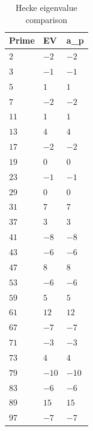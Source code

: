 \begin{table}[ht]
\centering
\begin{tabular}{lll}
\toprule
Prime & EV & a_p \\
\midrule
$2$ & $-2$ & $-2$ \\
$3$ & $-1$ & $-1$ \\
$5$ & $1$ & $1$ \\
$7$ & $-2$ & $-2$ \\
$11$ & $1$ & $1$ \\
$13$ & $4$ & $4$ \\
$17$ & $-2$ & $-2$ \\
$19$ & $0$ & $0$ \\
$23$ & $-1$ & $-1$ \\
$29$ & $0$ & $0$ \\
$31$ & $7$ & $7$ \\
$37$ & $3$ & $3$ \\
$41$ & $-8$ & $-8$ \\
$43$ & $-6$ & $-6$ \\
$47$ & $8$ & $8$ \\
$53$ & $-6$ & $-6$ \\
$59$ & $5$ & $5$ \\
$61$ & $12$ & $12$ \\
$67$ & $-7$ & $-7$ \\
$71$ & $-3$ & $-3$ \\
$73$ & $4$ & $4$ \\
$79$ & $-10$ & $-10$ \\
$83$ & $-6$ & $-6$ \\
$89$ & $15$ & $15$ \\
$97$ & $-7$ & $-7$ \\
\bottomrule
\end{tabular}
\caption{Hecke eigenvalue comparison}
\label{tab:hecke}
\end{table}
